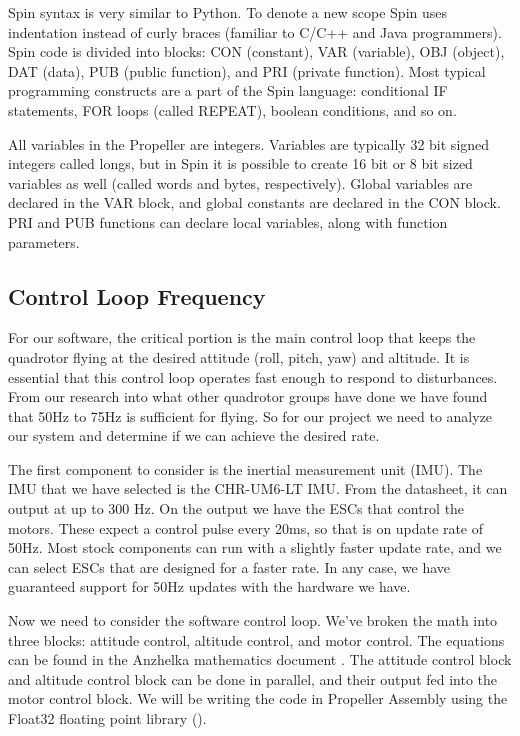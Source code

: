 \documentclass{article}
\numberwithin{equation}{section} %
\begin{document}
Spin syntax is very similar to Python. To denote a new scope Spin uses indentation instead of curly braces {} (familiar to C/C++ and Java programmers). Spin code is divided into blocks: CON (constant), VAR (variable), OBJ (object), DAT (data), PUB (public function), and PRI (private function). Most typical programming constructs are a part of the Spin language: conditional IF statements, FOR loops (called REPEAT), boolean conditions, and so on.

All variables in the Propeller are integers. Variables are typically 32 bit signed integers called longs, but in Spin it is possible to create 16 bit or 8 bit sized variables as well (called words and bytes, respectively). Global variables are declared in the VAR block, and global constants are declared in the CON block. PRI and PUB functions can declare local variables, along with function parameters. 

\subsection{Control Loop Frequency} \label{subsec:codeperformanceestimation}

For our software, the critical portion is the main control loop that keeps the quadrotor flying at the desired attitude (roll, pitch, yaw) and altitude. It is essential that this control loop operates fast enough to respond to disturbances. From our research into what other quadrotor groups have done we have found that 50Hz to 75Hz is sufficient for flying. So for our project we need to analyze our system and determine if we can achieve the desired rate.

The first component to consider is the inertial measurement unit (IMU). The IMU that we have selected is the CHR-UM6-LT IMU. From the datasheet, it can output at up to 300 Hz. On the output we have the ESCs that control the motors. These expect a control pulse every 20ms, so that is on update rate of 50Hz. Most stock components can run with a slightly faster update rate, and we can select ESCs that are designed for a faster rate. In any case, we have guaranteed support for 50Hz updates with the hardware we have.

Now we need to consider the software control loop. We've broken the math into three blocks: attitude control, altitude control, and motor control. The equations can be found in the Anzhelka mathematics document \cite{anzhelka_math}. The attitude control block and altitude control block can be done in parallel, and their output fed into the motor control block. We will be writing the code in Propeller Assembly using the Float32 floating point library (\cite{float32}).
\end{document}
